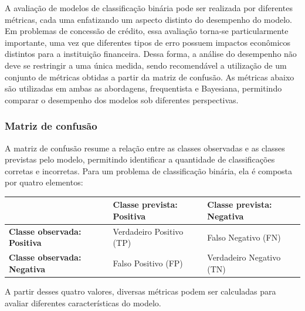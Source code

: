 \documentclass[
  brazilian,
  12pt,
  letterpaper,
  DIV=11,
  numbers=noendperiod]{scrartcl}
\newcounter{none} %
\begin{document}
A avaliação de modelos de classificação binária pode ser realizada por
diferentes métricas, cada uma enfatizando um aspecto distinto do
desempenho do modelo. Em problemas de concessão de crédito, essa
avaliação torna-se particularmente importante, uma vez que diferentes
tipos de erro possuem impactos econômicos distintos para a instituição
financeira. Dessa forma, a análise do desempenho não deve se restringir
a uma única medida, sendo recomendável a utilização de um conjunto de
métricas obtidas a partir da matriz de confusão. As métricas abaixo são
utilizadas em ambas as abordagens, frequentista e Bayesiana, permitindo
comparar o desempenho dos modelos sob diferentes perspectivas.

\subsubsection{Matriz de confusão}\label{matriz-de-confusuxe3o}

A matriz de confusão resume a relação entre as classes observadas e as
classes previstas pelo modelo, permitindo identificar a quantidade de
classificações corretas e incorretas. Para um problema de classificação
binária, ela é composta por quatro elementos:

{\def\LTcaptype{none} %
\begin{longtable}[]{@{}
  >{\raggedright\arraybackslash}p{}
  >{\raggedleft\arraybackslash}p{}
  >{\raggedleft\arraybackslash}p{}@{}}
\toprule\noalign{}
\begin{minipage}[b]{\linewidth}\raggedright
\end{minipage} & \begin{minipage}[b]{\linewidth}\raggedleft
Classe prevista: Positiva
\end{minipage} & \begin{minipage}[b]{\linewidth}\raggedleft
Classe prevista: Negativa
\end{minipage} \\
\midrule\noalign{}
\endhead
\bottomrule\noalign{}
\endlastfoot
\textbf{Classe observada: Positiva} & Verdadeiro Positivo (TP) & Falso
Negativo (FN) \\
\textbf{Classe observada: Negativa} & Falso Positivo (FP) & Verdadeiro
Negativo (TN) \\
\end{longtable}
}

A partir desses quatro valores, diversas métricas podem ser calculadas
para avaliar diferentes características do modelo.
\end{document}
